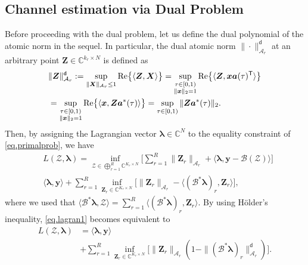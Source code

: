 \documentclass[conference,10pt]{IEEEtran}
\theoremstyle{remark}
\theoremstyle{plain}
\theoremstyle{definition}
\theoremstyle{remark}
\begin{document}
 \subsection{Channel estimation via Dual Problem}
Before proceeding with the dual problem, let us define the dual polynomial of the atomic norm in the sequel.  In particular, the dual atomic norm $\|\cdot\|_{\mathcal{A}_r}^{\mathsf{d}}$ at an arbitrary point $\bm{Z}\in \mathbb{C}^{k_r\times N}$ is defined as
\begin{align}\label{eq.dualnorm1}
&\|\bm{Z}\|_{\mathcal{A}_r}^{\mathsf{d}}:=\sup_{\|\bm{X}\|_{\mathcal{A}_r}\le 1}{\rm Re}\big\{\langle \bm{Z}, \bm{X} \rangle\big\}=\sup_{\substack{\tau\in [0,1)\\\|\bm{x}\|_2=1}}{\rm Re}\big\{\langle \bm{Z}, \bm{x}\bm{a}(\tau)^{\mathsf{T}} \rangle\big\} \nonumber\\
&=\sup_{\substack{\tau\in [0,1)\\\|\bm{x}\|_2=1}}{\rm Re}\big\{\langle \bm{x}, \bm{Z}\bm{a}^*(\tau) \rangle\big\}=\sup_{\tau\in [0,1)}\|\bm{Z}\bm{a}^*(\tau)\|_2.
\end{align}
Then, by assigning the Lagrangian vector $\bm{\lambda}\in\mathbb{C}^N$ to the equality constraint of \eqref{eq.primalprob}, we have
\begin{align}\label{eq.lagran1}
&L(\bm{\mathcal{Z}},\bm{\lambda})=\inf _{\bm{\mathcal{Z}}\in\bigoplus_{r=1}^R\mathbb{C}^{K_r\times N}}\Big[\sum_{r=1}^R\|\bm{Z}_r\|_{\mathcal{A}_r}+\langle \bm{\lambda},\bm{y}-\mathcal{B}(\bm{\mathcal{Z}}) \rangle\Big]\nonumber\\
&\langle \bm{\lambda},\bm{y}\rangle+\sum_{r=1}^R\inf_{\bm{Z}_r\in\mathbb{C}^{K_r\times N}}\Big[\|\bm{Z}_r\|_{\mathcal{A}_r}-\langle (\mathcal{B}^*\bm{\lambda})_r, \bm{Z}_r \rangle\Big],
\end{align}
where we used that $\langle \mathcal{B}^*\bm{\lambda}, \bm{\mathcal{Z}}\rangle=\sum_{r=1}^R\langle (\mathcal{B}^*\bm{\lambda})_r, \bm{Z}_r\rangle.$
By using H\"{o}lder's inequality, \eqref{eq.lagran1} becomes equivalent to
\begin{align}
\nonumber L(\bm{\mathcal{Z}},\bm{\lambda})&=\langle  \bm{\lambda},\bm{y}\rangle
\\
& +\sum_{r=1}^R\inf_{\bm{Z}_r\in\mathbb{C}^{K_r\times N}}\Big[\|\bm{Z}_r\|_{\mathcal{A}_r}(1-\|(\mathcal{B}^*\bm{\lambda})_r\|_{\mathcal{A}_r}^{\mathsf{d}})\Big].
\end{align}
\end{document}
